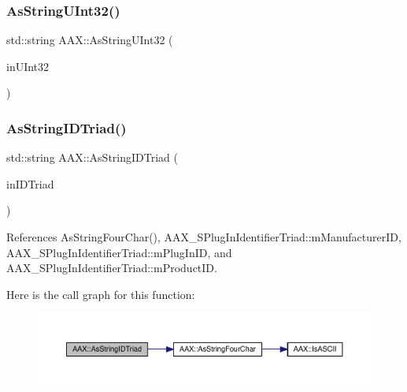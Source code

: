 \subsubsection{\texorpdfstring{AsStringUInt32()}{AsStringUInt32()}}
{\footnotesize\ttfamily std\+::string A\+A\+X\+::\+As\+String\+U\+Int32 (\begin{DoxyParamCaption}\item[{uint32\+\_\+t}]{in\+U\+Int32 }\end{DoxyParamCaption})\hspace{0.3cm}{\ttfamily [inline]}}

\mbox{\label{a00852_a89e00fcb44e30c443bebba0f026ef62a}} 
\subsubsection{\texorpdfstring{AsStringIDTriad()}{AsStringIDTriad()}}
{\footnotesize\ttfamily std\+::string A\+A\+X\+::\+As\+String\+I\+D\+Triad (\begin{DoxyParamCaption}\item[{const \mbox{\hyperlink{a01425}{A\+A\+X\+\_\+\+S\+Plug\+In\+Identifier\+Triad}} \&}]{in\+I\+D\+Triad }\end{DoxyParamCaption})\hspace{0.3cm}{\ttfamily [inline]}}



References As\+String\+Four\+Char(), A\+A\+X\+\_\+\+S\+Plug\+In\+Identifier\+Triad\+::m\+Manufacturer\+ID, A\+A\+X\+\_\+\+S\+Plug\+In\+Identifier\+Triad\+::m\+Plug\+In\+ID, and A\+A\+X\+\_\+\+S\+Plug\+In\+Identifier\+Triad\+::m\+Product\+ID.

Here is the call graph for this function\+:
\nopagebreak
\begin{figure}[H]
\begin{center}
\leavevmode
\includegraphics[width=350pt]{a00852_a89e00fcb44e30c443bebba0f026ef62a_cgraph}
\end{center}
\end{figure}
\mbox{\label{a00852_a34d219233eb5c9836b837fa2a67150d1}} 
